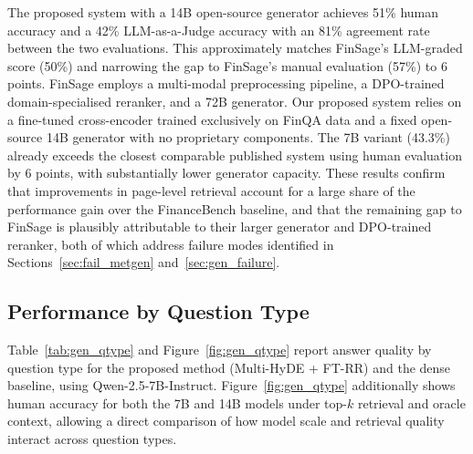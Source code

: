 \documentclass[12pt,twoside,maitrise]{dms}
\theoremstyle{definition}
\numberwithin{equation}{section}
\numberwithin{table}{chapter}
\numberwithin{figure}{chapter}
\begin{document}
The proposed system with a 14B open-source generator achieves 51\% human accuracy and a 42\% LLM-as-a-Judge accuracy with an 81\% agreement rate between the two evaluations. This approximately matches FinSage's LLM-graded score (50\%) and narrowing the gap to FinSage's manual
evaluation (57\%) to 6 points. FinSage employs a multi-modal preprocessing pipeline, a
DPO-trained domain-specialised reranker, and a 72B generator. Our proposed system
relies on a fine-tuned cross-encoder trained exclusively on FinQA data and a fixed
open-source 14B generator with no proprietary components. The 7B variant (43.3\%)
already exceeds the closest comparable published system using human evaluation
\citep{jimeno2024financial} by 6 points, with substantially lower generator capacity.
These results confirm that improvements in page-level retrieval account for a large share
of the performance gain over the FinanceBench baseline, and that the remaining gap to
FinSage is plausibly attributable to their larger generator and DPO-trained reranker,
both of which address failure modes identified in Sections~\ref{sec:fail_metgen}
and~\ref{sec:gen_failure}.

\subsection{Performance by Question Type}
\label{sec:gen_qtype}

Table~\ref{tab:gen_qtype} and Figure~\ref{fig:gen_qtype} report answer quality by
question type for the proposed method (Multi-HyDE + FT-RR) and the dense baseline,
using Qwen-2.5-7B-Instruct. Figure~\ref{fig:gen_qtype} additionally shows human
accuracy for both the 7B and 14B models under top-$k$ retrieval and oracle context,
allowing a direct comparison of how model scale and retrieval quality interact across
question types.
\end{document}
